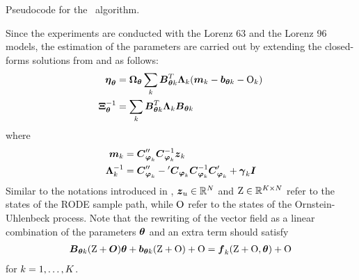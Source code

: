 \begin{algorithm}
    \centering
    \caption{Pseudocode for the \algolpmfsde\ algorithm.}
    \label{algo-lpmf-sde}
    \begin{algorithmic}[1]
        \EndFor
    \end{algorithmic}
\end{algorithm}

Since the experiments are conducted with the Lorenz 63 and the Lorenz 96 models, the estimation of the parameters are carried out by extending the closed-forms solutions from  and  as follows:
\begin{align}
    \boldsymbol{\eta}_{\boldsymbol{\theta}} 
    & = \boldsymbol{\Omega}_{\boldsymbol{\theta}} \sum_k{\boldsymbol{B}_{\boldsymbol{\theta}{k}}^T\boldsymbol{\Lambda}_{k}(\boldsymbol{m}_{k} - \boldsymbol{b}_{\boldsymbol{\theta}{k}} - \mathrm{O}_k)}    
    \\
    \boldsymbol{\Xi}_{\boldsymbol{\theta}}^{-1}
    & = \sum_k{\boldsymbol{B}_{\boldsymbol{\theta}{k}}^T\boldsymbol{\Lambda}_{k}\boldsymbol{B}_{\boldsymbol{\theta}{k}}}
\end{align}
where 
\begin{align}
    \boldsymbol{m}_{k} &= \boldsymbol{C}^{\prime\prime}_{\boldsymbol{\varphi}_{k}}\boldsymbol{C}_{\boldsymbol{\varphi}_{k}}^{-1}\boldsymbol{z}_k
    \\
    \boldsymbol{\Lambda}_{k}^{-1} &= \boldsymbol{C}^{\prime\prime}_{\boldsymbol{\varphi}_{k}} - {}^{\prime}\boldsymbol{C}_{\boldsymbol{\varphi}_{k}}\boldsymbol{C}_{\boldsymbol{\varphi}_{k}}^{-1}\boldsymbol{C}^{\prime}_{\boldsymbol{\varphi}_{k}} + \boldsymbol{\gamma}_k \boldsymbol{I}
\end{align}
Similar to the notations introduced in , $\boldsymbol{z}_u \in \mathbb{R}^N$ and $\mathrm{Z} \in \mathbb{R}^{K \times N}$ refer to the states of the RODE sample path, while $\mathrm{O}$ refer to the states of the Ornstein-Uhlenbeck process.
Note that the rewriting of the vector field as a linear combination of the parameters $\boldsymbol{\theta}$ and an extra term should satisfy
\begin{align}
    \boldsymbol{B}_{\boldsymbol{\theta} k}(\mathrm{Z} + \boldsymbol{O})\boldsymbol{\theta} + \boldsymbol{b}_{\boldsymbol{\theta} k}(\mathrm{Z} + \mathrm{O}) + \mathrm{O} 
    = 
    \boldsymbol{f}_k(\mathrm{Z} + \mathrm{O}, \boldsymbol{\theta}) + \mathrm{O}
\end{align}
for $k = 1,\dots,K$.

